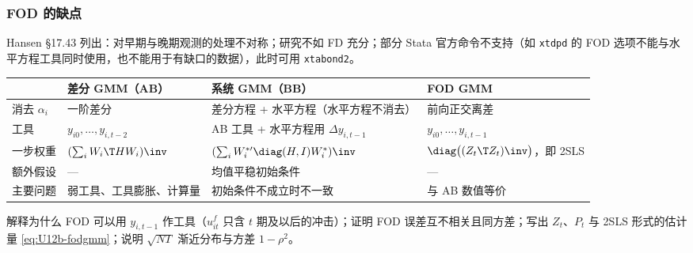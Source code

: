 \subsubsection{FOD 的缺点}

Hansen §17.43 列出：对早期与晚期观测的处理不对称；研究不如 FD 充分；部分 Stata 官方命令不支持（如 \texttt{xtdpd} 的 FOD 选项不能与水平方程工具同时使用，也不能用于有缺口的数据），此时可用 \texttt{xtabond2}。

\begin{summary}
\small
\begin{tabularx}{\linewidth}{lLLL}
\toprule
 & 差分 GMM（AB） & 系统 GMM（BB） & FOD GMM\\
\midrule
消去 $\alpha_i$ & 一阶差分 & 差分方程 + 水平方程（水平方程不消去） & 前向正交离差\\
工具 & $y_{i0},\dots,y_{i,t-2}$ & AB 工具 + 水平方程用 $\Delta y_{i,t-1}$ & $y_{i0},\dots,y_{i,t-1}$\\
一步权重 & $(\sum_iW_i\T HW_i)\inv$ & $(\sum_iW_i^{*\prime}\diag(H,I)W_i^*)\inv$ & $\diag\big((Z_t\T Z_t)\inv\big)$，即 2SLS\\
额外假设 & — & 均值平稳初始条件 & —\\
主要问题 & 弱工具、工具膨胀、计算量 & 初始条件不成立时不一致 & 与 AB 数值等价\\
\bottomrule
\end{tabularx}
\end{summary}

\begin{keypt}
解释为什么 FOD 可以用 $y_{i,t-1}$ 作工具（$u_{it}^f$ 只含 $t$ 期及以后的冲击）；证明 FOD 误差互不相关且同方差；写出 $Z_t$、$P_t$ 与 2SLS 形式的估计量 \eqref{eq:U12b-fodgmm}；说明 $\sqrt{NT}$ 渐近分布与方差 $1-\rho^2$。
\end{keypt}

